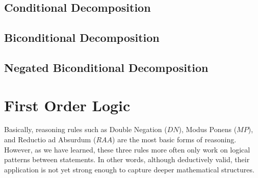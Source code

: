 \documentclass[12pt,a4paper,openany]{article}
\begin{document}
\subsection {Conditional Decomposition }
\begin{center}
\boxed{
\begin{minipage}{6cm}
\centering
\begin{forest}
%
[$A \to B$
[$\neg A$]
[$B$]
]
\end{forest}
\end{minipage}
}
\end{center}

\subsection {Biconditional Decomposition}
\begin{center}
\end{center}

\subsection {Negated Biconditional Decomposition}
\begin{center}
\end{center}

\section{First Order Logic }

Basically, reasoning rules such as Double Negation (\(DN\)), Modus
Ponens (\(MP\)), and Reductio ad Absurdum (\(RAA\)) are the most basic
forms of reasoning. However, as we have learned, these three rules more
often only work on logical patterns between statements. In other words,
although deductively valid, their application is not yet strong enough
to capture deeper mathematical structures.
\end{document}
